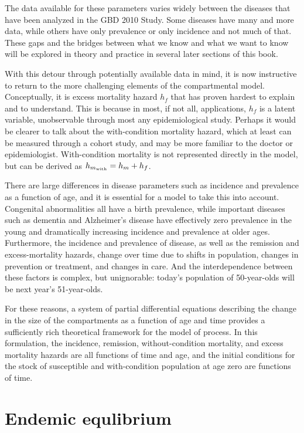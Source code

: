 The data available for these parameters varies widely
between the diseases that have been analyzed in the GBD 2010 Study. Some diseases have
many and more data, while others have only prevalence or only incidence and
not much of that. These gaps and the bridges between what we know and
what we want to know will be explored in theory and practice in
several later sections of this book.

With this detour through potentially available data in mind, it is now
instructive to return to the more challenging elements of the
compartmental model. Conceptually, it is excess mortality hazard $h_f$ that has
proven hardest to explain and to understand. This is because in most,
if not all, applications, $h_f$ is a latent variable, unobservable
through most any epidemiological study. Perhaps it would be clearer to
talk about the with-condition mortality hazard, which at least can be
measured through a cohort study, and may be more familiar to the
doctor or epidemiologist. With-condition mortality is not represented
directly in the model, but can be derived as $h_{m_{\text{with}}} = h_m+h_f$.

There are large differences in disease parameters such as incidence
and prevalence as a function of age, and it is essential for a model
to take this into account.  Congenital abnormalities all have a birth
prevalence, while important diseases such as dementia and Alzheimer's
disease have effectively zero prevalence in the young and
dramatically increasing incidence and prevalence at older
ages. Furthermore, the incidence and prevalence of disease, as well as
the remission and excess-mortality hazards, change over time due to
shifts in population, changes in prevention or treatment, and changes
in care. And the interdependence between these factors is complex, but
unignorable: today's population of 50-year-olds will be next year's
51-year-olds.

For these reasons, a system of partial differential equations
describing the change in the size of the compartments as a function of
age and time provides a sufficiently rich theoretical framework for
the model of process.  In this formulation, the incidence, remission,
without-condition mortality, and excess mortality hazards are all
functions of time and age, and the initial conditions for the stock of
susceptible and with-condition population at age zero are functions of
time.

\section{Endemic equlibrium}
\label{theory-forward_sim-compartmental_model-simplying_assumptions}

